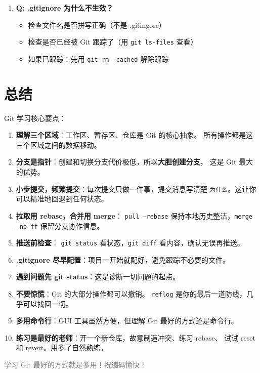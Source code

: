 \documentclass[12pt,a4paper]{article}
\begin{document}
\begin{enumerate}[itemsep=10pt]
    \item \textbf{Q: .gitignore 为什么不生效？}
    \begin{itemize}
        \item 检查文件名是否拼写正确（不是 .gitingore）
        \item 检查是否已经被 Git 跟踪了（用 \texttt{git ls-files} 查看）
        \item 如果已跟踪：先用 \texttt{git rm --cached} 解除跟踪
    \end{itemize}

\end{enumerate}

\section{总结}

Git 学习核心要点：

\begin{enumerate}[itemsep=8pt]
    \item \textbf{理解三个区域}：工作区、暂存区、仓库是 Git 的核心抽象。
    所有操作都是这三个区域之间的数据移动。

    \item \textbf{分支是指针}：创建和切换分支代价极低，所以\textbf{大胆创建分支}，
    这是 Git 最大的优势。

    \item \textbf{小步提交，频繁提交}：每次提交只做一件事，提交消息写清楚
    \texttt{为什么}。这让你可以精准地回退到任何状态。

    \item \textbf{拉取用 rebase，合并用 merge}：
    \texttt{pull --rebase} 保持本地历史整洁，\texttt{merge --no-ff} 保留分支协作信息。

    \item \textbf{推送前检查}：
    \texttt{git status} 看状态，\texttt{git diff} 看内容，确认无误再推送。

    \item \textbf{.gitignore 尽早配置}：项目一开始就配好，避免跟踪不必要的文件。

    \item \textbf{遇到问题先 git status}：这是诊断一切问题的起点。

    \item \textbf{不要惊慌}：Git 的大部分操作都可以撤销。
    \texttt{reflog} 是你的最后一道防线，几乎可以找回一切。

    \item \textbf{多用命令行}：GUI 工具虽然方便，但理解 Git 最好的方式还是命令行。

    \item \textbf{练习是最好的老师}：开一个新仓库，故意制造冲突、练习 rebase、
    试试 reset 和 revert。用多了自然熟练。
\end{enumerate}

\begin{center}
\vspace{1cm}
\textcolor{gray}{\small 学习 Git 最好的方式就是多用！祝编码愉快！}
\end{center}
\end{document}

